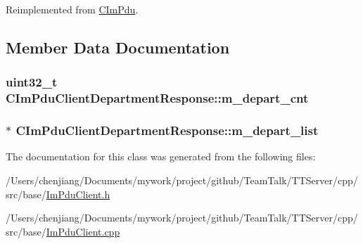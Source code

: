 Reimplemented from \hyperlink{class_c_im_pdu_a887912f445b3e864d33f9e7f2325f1fc}{C\+Im\+Pdu}.



\subsection{Member Data Documentation}
\hypertarget{class_c_im_pdu_client_department_response_a8f198cd20bdc196efd977c8db1058ea9}{}
\subsubsection[{m\+\_\+depart\+\_\+cnt}]{\setlength{\rightskip}{0pt plus 5cm}uint32\+\_\+t C\+Im\+Pdu\+Client\+Department\+Response\+::m\+\_\+depart\+\_\+cnt\hspace{0.3cm}{\ttfamily [private]}}\label{class_c_im_pdu_client_department_response_a8f198cd20bdc196efd977c8db1058ea9}
\hypertarget{class_c_im_pdu_client_department_response_a6d9ef98a9cce666dbbcb82ad4a578aaf}{}
\subsubsection[{m\+\_\+depart\+\_\+list}]{$\ast$ C\+Im\+Pdu\+Client\+Department\+Response\+::m\+\_\+depart\+\_\+list\hspace{0.3cm}{\ttfamily [private]}}\label{class_c_im_pdu_client_department_response_a6d9ef98a9cce666dbbcb82ad4a578aaf}


The documentation for this class was generated from the following files\+:\begin{DoxyCompactItemize}
\item 
/\+Users/chenjiang/\+Documents/mywork/project/github/\+Team\+Talk/\+T\+T\+Server/cpp/src/base/\hyperlink{_im_pdu_client_8h}{Im\+Pdu\+Client.\+h}\item 
/\+Users/chenjiang/\+Documents/mywork/project/github/\+Team\+Talk/\+T\+T\+Server/cpp/src/base/\hyperlink{_im_pdu_client_8cpp}{Im\+Pdu\+Client.\+cpp}\end{DoxyCompactItemize}
